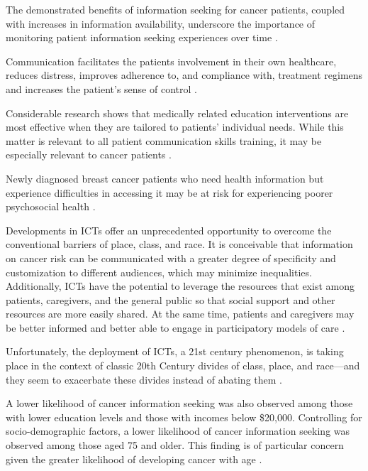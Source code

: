 The demonstrated benefits of information seeking for cancer patients, coupled with increases in information availability, underscore the importance of monitoring patient information seeking experiences over time \cite{finney_rutten_cancer-related_2016}.

Communication facilitates the patients involvement in their own healthcare, reduces distress, improves adherence to, and compliance with, treatment regimens and increases the patient's sense of control \cite{viswanath_science_2005}.

Considerable research shows that medically related education interventions are most effective when they are tailored to patients' individual needs. While this matter is relevant to all patient communication skills training, it may be especially relevant to cancer patients \cite{cegala_patient_2003}.

Newly diagnosed breast cancer patients who need health information but experience difficulties in accessing it may be at risk for experiencing poorer psychosocial health \cite{arora_barriers_2002}.

Developments in ICTs offer an unprecedented opportunity to overcome the conventional barriers of place, class, and race. It is conceivable that information on cancer risk can be communicated with a greater degree of specificity and customization to different audiences, which may minimize inequalities. Additionally, ICTs have the potential to leverage the resources that exist among patients, caregivers, and the general public so that social support and other resources are more easily shared. At the same time, patients and caregivers may be better informed and better able to engage in participatory models of care \cite{viswanath_communications_2012}.

Unfortunately, the deployment of ICTs, a 21st century phenomenon, is taking place in the context of classic 20th Century divides of class, place, and race—and they seem to exacerbate these divides instead of abating them \cite{viswanath_race_2011}.

A lower likelihood of cancer information seeking was also observed among those with lower education levels and those with incomes below \$20,000. Controlling for socio-demographic factors, a lower likelihood of cancer information seeking was observed among those aged 75 and older. This finding is of particular concern given the greater likelihood of developing cancer with age \cite{finney_rutten_cancer-related_2016}.


